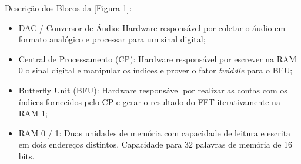\documentclass{article}
\newcommand{\tit}[1]{\textit{#1}}
\begin{document}
Descrição dos Blocos da [Figura 1]:
\begin{itemize}
    \item DAC / Conversor de Áudio: Hardware responsável por coletar o áudio em formato analógico
    e processar para um sinal digital;
    \item Central de Processamento (CP): Hardware responsável por escrever na RAM 0 o sinal digital e
    manipular os índices e prover o fator \tit{twiddle} para o BFU;
    \item Butterfly Unit (BFU): Hardware responsável por realizar as contas com os índices fornecidos
    pelo CP e gerar o resultado do FFT iterativamente na RAM 1;
    \item RAM 0 / 1: Duas unidades de memória com capacidade de leitura e escrita em dois endereços distintos.
    Capacidade para 32 palavras de memória de 16 bits.
\end{itemize}

\newpage


\end{document}
